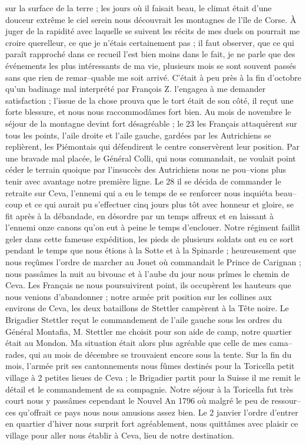 \documentclass[12pt]{article}
\begin{document}
 sur la surface de la terre ; les jours où il
faisait beau, le climat était d’une douceur extrême le ciel serein nous découvrait les montagnes de
l’île de Corse. À juger de la rapidité avec laquelle se suivent les récits de mes duels on pourrait
me croire querelleur, ce que je n’étais certainement pas ; il faut observer, que ce qui paraît
rapproché dans ce recueil l’est bien moins dans le fait, je ne parle que des événements les plus
intéressants de ma vie, plusieurs mois se sont souvent passés sans que rien de remar–quable me soit
arrivé. C’était à peu près à la fin d’octobre qu’un badinage mal interprété par François Z.
l’engagea à me demander satisfaction ; l’issue de la chose prouva que le tort était de son côté, il
reçut une forte blessure, et nous nous raccommodâmes fort bien. Au mois de novembre le séjour de la
montagne devint fort désagréable ; le 23 les Français attaquèrent sur tous les points, l’aile droite
et l’aile gauche, gardées par les Autrichiens se replièrent, les Piémontais qui défendirent le
centre conservèrent leur position. Par une bravade mal placée, le Général Colli, qui nous
commandait, ne voulait point céder le terrain quoique par l’insuccès des Autrichiens nous ne
pou–vions plus tenir avec avantage notre première ligne. Le 28 il se décida de commander le retraite
sur Ceva, l’ennemi qui a eu le temps de se renforcer nous inquiéta beau–coup et ce qui aurait pu
s’effectuer cinq jours plus tôt avec honneur et gloire, se fit après à la débandade, en désordre par
un temps affreux et en laissant à l’ennemi onze canons qu’on eut à peine le temps d’enclouer. Notre
régiment faillit geler dans cette fameuse expédition, les pieds de plusieurs soldats ont eu ce sort
pendant le temps que nous étions à la Sotte et à la Spinarde ; heureusement que nous reçûmes l’ordre
de marcher au Jouet où commandait le Prince de Carignan ; nous passâmes la nuit au bivouac et à
l’aube du jour nous prîmes le chemin de Ceva. Les Français ne nous poursuivirent point, ils
occupèrent les hauteurs que nous venions d’abandonner ; notre armée prit position sur les collines
aux environs de Ceva, les deux bataillons de Stettler campèrent à la Tête noire. Le Brigadier
Stettler reçut le commandement de l’aile gauche sous les ordres du Général Montafia, M. Stettler me
choisit pour son aide de camp, notre quartier était au Mondon. Ma situation était alors plus
agréable que celle de mes cama–rades, qui au mois de décembre se trouvaient encore sous la tente.
Sur la fin du mois, l’armée prit ses cantonnements nous fûmes destinés pour la Toricella petit
village à 2 petites lieues de Ceva ; le Brigadier partit pour la Suisse il me remit le détail et le
commandement de sa compagnie. Notre séjour à la Toricella fut très court nous y passâmes cependant
le Nouvel An 1796 où malgré le peu de ressour–ces qu’offrait ce pays nous nous amusions assez bien.
Le 2 janvier l’ordre d’entrer en quartier d’hiver nous surprit fort agréablement, nous quittâmes
avec plaisir ce village pour aller nous établir à Ceva, lieu de notre destination.
\end{document}
